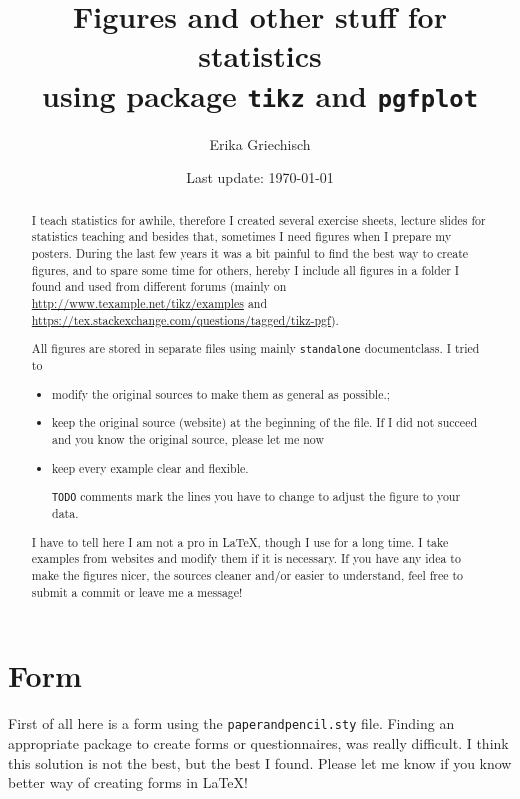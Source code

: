 \documentclass[a4paper]{article}
\title{Figures and other stuff for statistics\\ using package \texttt{tikz} and \texttt{pgfplot}}
\author{Erika Griechisch}
\date{\small Last update: \today}
\begin{document}
\maketitle
\thispagestyle{empty}
	\begin{abstract}
	I teach statistics for awhile, therefore I created several exercise sheets, lecture slides for statistics teaching and besides that, sometimes I need figures when I prepare my posters. During the last few years it was a bit painful to find the best way to create figures, and to spare some time for others, hereby I include all figures in a folder I found and used from different forums (mainly on \url{http://www.texample.net/tikz/examples} and \url{https://tex.stackexchange.com/questions/tagged/tikz-pgf}). 
	

	All figures are stored in separate files using mainly \texttt{standalone} documentclass. I tried to 
	\begin{itemize}
	\item modify the original sources to make them as general as possible.;
	\item keep the original source (website) at the beginning of the file. 
		If I did not succeed and you know the original source, please let me now
	\item keep every example clear and flexible.
	
		 \texttt{TODO} comments mark the lines you have to change to adjust the figure to your data. 
	\end{itemize}

	I have to tell here I am not a pro in \LaTeX, though I use for a long time. I take examples from websites and modify them if it is necessary. If you have any idea to make the figures nicer, the sources cleaner and/or easier to understand, feel free to submit a commit or leave me a message!
	

	\end{abstract}
	
	\tableofcontents
	\clearpage
	
	\section{Form}
	
	First of all here is a form using the \texttt{paperandpencil.sty} file. 
	Finding an appropriate package to create forms or questionnaires, was really difficult. 
	I think this solution is not the best, but the best I found.
	Please let me know if you know better way of creating forms in \LaTeX{}!
	\vfill
	
\end{document}
